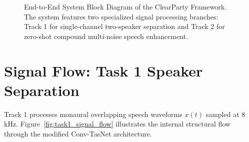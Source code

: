 \documentclass[11pt,a4paper]{report}
\begin{document}
\begin{figure}[H]
\caption{End-to-End System Block Diagram of the ClearParty Framework. The system features two specialized signal processing branches: Track 1 for single-channel two-speaker separation and Track 2 for zero-shot compound multi-noise speech enhancement.}
\label{fig:overall_block_diagram}
\end{figure}

\section{Signal Flow: Task 1 Speaker Separation}
Track 1 processes monaural overlapping speech waveforms $x(t)$ sampled at 8 kHz. Figure~\ref{fig:task1_signal_flow} illustrates the internal structural flow through the modified Conv-TasNet architecture.
\end{document}

